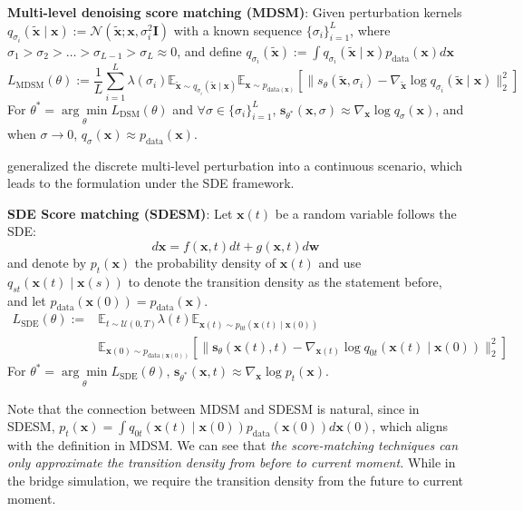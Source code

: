 \documentclass{article}
\newcommand{\x}{\mathbf{x}}
\newcommand{\s}{\mathbf{s}}
\newcommand{\I}{\mathbf{I}}
\newcommand{\w}{\mathbf{w}}
\begin{document}
\begin{proposition}
    \textbf{Multi-level denoising score matching (MDSM)}: Given perturbation kernels $q_{\sigma_i}(\tilde{\x}\mid\x):=\mathcal{N}(\tilde{\x};\x,\sigma_i^2\I)$ with a known sequence $\{\sigma_i\}_{i=1}^L$, where $\sigma_1 > \sigma_2 > \dots > \sigma_{L-1} > \sigma_L\approx 0$, and define $q_{\sigma_i}(\tilde{\x}):= \int q_{\sigma_i}(\tilde{\x}\mid\x)p_{\text{data}}(\x)d\x$
    \begin{equation}
        L_{\text{MDSM}}(\theta) := \frac{1}{L}\sum^L_{i=1}\lambda(\sigma_i)\mathbb{E}_{\tilde{\x}\sim q_{\sigma_i}(\tilde{\x}\mid \x)} \mathbb{E}_{\x\sim p_{\text{data}(\x)}}\left[\| s_{\theta}(\tilde{\x}, \sigma_i) - \nabla_{\tilde{\x}}\log q_{\sigma_i}(\tilde{\x}\mid \x) \|^2_2\right]
    \end{equation}
    For $\theta^* = \underset{\theta}{\arg\min} L_{\text{DSM}}(\theta)$ and $\forall\sigma\in\{\sigma_i\}_{i=1}^L$, $\s_{\theta^*}(\x, \sigma)\approx \nabla_\x\log q_{\sigma}(\x)$, and when $\sigma\to 0$, $q_{\sigma}(\x)\approx p_{\text{data}}(\x)$.
\end{proposition}
\cite{song2021scorebased} generalized the discrete multi-level perturbation into a continuous scenario, which leads to the formulation under the SDE framework.
\begin{proposition}
    \textbf{SDE Score matching (SDESM)}:
    Let $\x(t)$ be a random variable follows the SDE:
    \begin{equation} \label{eq: sde}
        d\x = f(\x, t)dt + g(\x, t)d\w
    \end{equation}
    and denote by $p_t(\x)$ the probability density of $\x(t)$ and use $q_{st}(\x(t)\mid\x(s))$ to denote the transition density as the statement before, and let $p_{\text{data}}(\x(0)) = p_{\text{data}}(\x)$.
    \begin{equation}
        \begin{split}
            L_{\text{SDE}}(\theta) := &\mathbb{E}_{t\sim\mathcal{U}(0, T)}\lambda(t)\mathbb{E}_{\x(t)\sim p_{0t}(\x(t)\mid \x(0))} \\
            &\mathbb{E}_{\x(0)\sim p_{\text{data}(\x(0))}}\left[\| \s_{\theta}(\x(t), t) - \nabla_{\x(t)}\log q_{0t}(\x(t)\mid \x(0)) \|^2_2\right]
        \end{split}
    \end{equation}
    For $\theta^* = \underset{\theta}{\arg\min} L_{\text{SDE}}(\theta)$, $\s_{\theta^*}(\x, t)\approx \nabla_\x \log p_t(\x)$.
\end{proposition}
Note that the connection between MDSM and SDESM is natural, since in SDESM, $p_t(\x) = \int q_{0t}(\x(t)\mid\x(0))p_{\text{data}}(\x(0))d\x(0)$, which aligns with the definition in MDSM. We can see that \emph{the score-matching techniques can only approximate the transition density from before to current moment.} While in the bridge simulation, we require the transition density from the future to current moment.
\end{document}
